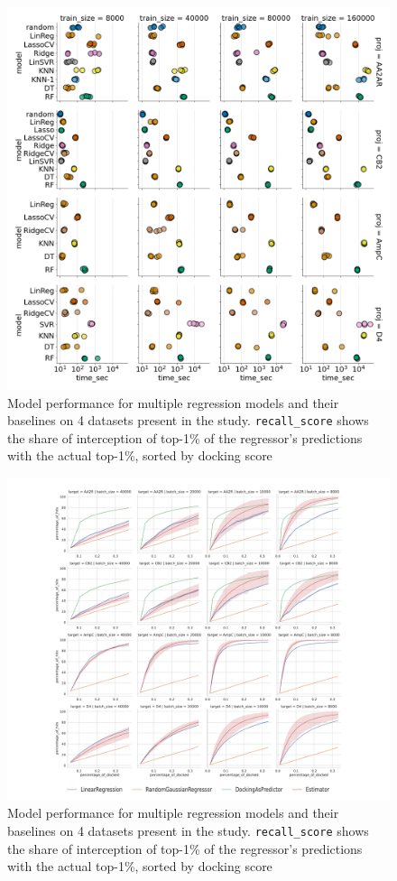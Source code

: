\begin{figure}[ht]
\centering
\includegraphics[width=1.0\textwidth]{figures/figure_3_single-shot-performance.png}
\caption{Model performance for multiple regression models and their baselines on 4 datasets present in the study. \texttt{recall\_score} shows the share of interception of top-1\% of the regressor's predictions with the actual top-1\%, sorted by docking score}
\label{fig:fig_3_singleshot}
\end{figure}


\begin{figure}[ht]
\centering
\includegraphics[width=1.0\textwidth]{figures/figure_4_iterations.pdf}
\caption{Model performance for multiple regression models and their baselines on 4 datasets present in the study. \texttt{recall\_score} shows the share of interception of top-1\% of the regressor's predictions with the actual top-1\%, sorted by docking score}
\label{fig:fig_4_extrapolation}
\end{figure}

